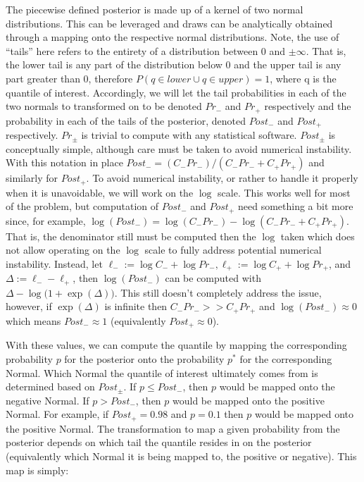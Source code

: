 The piecewise defined posterior is made up of a kernel of two normal distributions. This can be leveraged and draws can be analytically obtained through a mapping onto the respective normal distributions. Note, the use of ``tails'' here refers to the entirety of a distribution between 0 and $\pm \infty$. That is, the lower tail is any part of the distribution below 0 and the upper tail is any part greater than 0, therefore $P(q \in lower \cup q \in upper) = 1$, where q is the quantile of interest. Accordingly, we will let the tail probabilities in each of the two normals to transformed on to be denoted $Pr_{-}$ and $Pr_{+}$ respectively and the probability in each of the tails of the posterior, denoted $Post_{-}$ and $Post_{+}$ respectively. $Pr_{\pm}$ is trivial to compute with any statistical software. $Post_{\pm}$ is conceptually simple, although care must be taken to avoid numerical instability. With this notation in place $Post_- = (C_{-} Pr_{-})/(C_{-} Pr_{-} + C_{+} Pr_{+})$ and similarly for $Post_+$. To avoid numerical instability, or rather to handle it properly when it is unavoidable, we will work on the $\log$ scale. This works well for most of the problem, but computation of $Post_-$ and $Post_+$ need something a bit more since, for example, $\log(Post_-) = \log(C_{-}Pr_{-}) - \log(C_{-} Pr_{-} + C_{+} Pr_{+})$. That is, the denominator still must be computed then the $\log$ taken which does not allow operating on the $\log$ scale to fully address potential numerical instability. Instead, let $\ell_{-} := \log C_{-} + \log Pr_{-}, \ell_{+} := \log C_{+} + \log Pr_{+}$, and $\Delta := \ell_{-} - \ell_{+}$, then $\log(Post_-)$ can be computed with $\Delta - \log\bigl(1 + \exp(\Delta)\bigr)$. This still doesn't completely address the issue, however, if $\exp(\Delta)$ is infinite then $C_-Pr_- >> C_+Pr_+$ and $\log(Post_-) \approx 0$ which means $Post_- \approx 1$ (equivalently $Post_+ \approx 0$).

With these values, we can compute the quantile by mapping the corresponding probability $p$ for the posterior onto the probability $p^*$ for the corresponding Normal. Which Normal the quantile of interest ultimately comes from is determined based on $Post_{\pm}$. If $p \leq Post_{-}$, then $p$ would be mapped onto the negative Normal. If $p > Post_{-}$, then $p$ would be mapped onto the positive Normal.  For example, if $Post_{+} = 0.98$ and $p = 0.1$ then $p$ would be mapped onto the positive Normal. The transformation to map a given probability from the posterior depends on which tail the quantile resides in on the posterior (equivalently which Normal it is being mapped to, the positive or negative). This map is simply:


